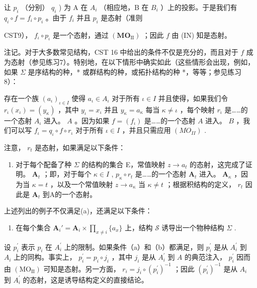让 \(p_{i}\) （分别） \(q_{i}\) ) 为 A 在 \(A_{i}\) （相应地，B 在 \(B_{i}\) ）上的投影。于是我们有 \(q_{i} \circ f = f_{i} \circ p_{i}\) 。由于 \(f_{i}\) 并且 \(p_{i}\) 是态射（准则

CST9）， \(f_{\iota} \circ p_{\iota}\) 是一个态射，通过 \((\mathbf{MO}_{\mathrm{II}})\) ；因此 \(f\) 由 (IN) 知是态射。

注记。对于大多数常见结构，CST 16 中给出的条件不仅是充分的，而且对于 \(f\) 成为态射（参见练习7）。特别地，在以下情形中确实如此（这些情形会出现，例如，如果 \(\Sigma\) 是序结构的种，* 或群结构的种，或拓扑结构的种 *，等等；参见练习8）：

存在一个族 \((a_{\iota})_{\iota\in I}\) 使得 \(a_{\iota}\in A_{\iota}\) 对于所有 \(\iota \in I\) 并且使得，如果我们令 \(r_\iota(x_\iota) = (y_\kappa)\) ，其中 \(y_{\iota} = x_{\iota}\) 并且 \(y_{\kappa} = a_{\kappa}\) 每当 \(\kappa\neq \iota\) ，每个映射 \(r_\iota\) 是……的一个态射 \(A_{\iota}\) 进入。 \(A\) 。因为如果 \(f = (f_\iota)\) 是……的一个态射 \(A\) 进入。 \(B\) ，我们可以写 \(f_{\iota} = q_{\iota}\circ f\circ r_{\iota}\) 对于所有 \(\iota \in I\) ，并且只需应用 \((MO_{II})\) .

注意， \(r_t\) 是态射，如果满足以下条件：

\begin{enumerate}
\def\labelenumi{(\alph{enumi})}
\tightlist
\item
  对于每个配备了种 \(\Sigma\) 的结构的集合 E，常值映射 \(z \to a_{t}\) 的态射，这完成了证明。 \(\mathbf{A}_{t}\) ；即，对于每个 \(\kappa \in I\) , \(p_{\kappa} \circ r_{t}\) 是……的一个态射 \(\mathbf{A}_{t}\) 进入。 \(\mathbf{A}_{\kappa}\) ，因为当 \(\kappa = t\) ，以及一个常值映射 \(z \to a_{\kappa}\) 当 \(\kappa \neq t\) ；根据积结构的定义， \(r_{t}\) 因此是 \(\mathbf{A}_{t}\) 到A的一个态射。
\end{enumerate}

上述列出的例子不仅满足(a)，还满足以下条件：

\begin{enumerate}
\def\labelenumi{(\alph{enumi})}
\setcounter{enumi}{1}
\tightlist
\item
  在每个集合 \(\mathbf{A}_i' = \mathbf{A}_i \times \prod_{x \neq i} \{a_x\}\) 上，结构 \(\mathcal{S}\) 诱导出一个物种结构 \(\Sigma\) .
\end{enumerate}

设 \(p_{i}^{\prime}\) 表示 \(p_{i}\) 在 \(A_{i}^{\prime}\) 上的限制。如果条件（a）和（b）都满足，则 \(p_{i}^{\prime}\) 是从 \(A_{i}^{\prime}\) 到 \(A_{i}\) 上的同构。事实上， \(p_{i}^{\prime} = p_{i} \circ j_{i}\) ，其中 \(j_{i}\) 是从 \(A_{i}^{\prime}\) 到 \(A\) 的典范注入， \(p_{i}^{\prime}\) 因而由 \((\mathrm{MO}_{\mathrm{II}})\) 可知是态射。另一方面， \(r_{i} = j_{i} \circ (p_{i}^{\prime})^{-1}\) ；因此 \((p_{i}^{\prime})^{-1}\) 是从 \(A_{i}\) 到 \(A_{i}^{\prime}\) 的态射，这是诱导结构定义的直接结论。

